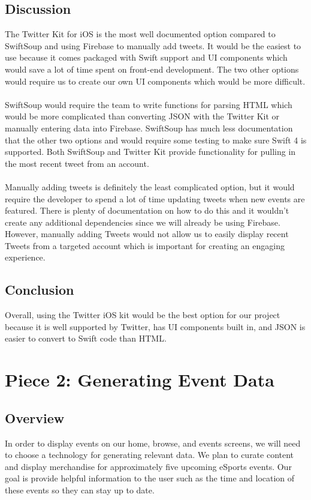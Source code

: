 \documentclass[onecolumn, draftclsnofoot,10pt, compsoc]{IEEEtran}
\begin{document}
\subsection{Discussion}
The Twitter Kit for iOS is the most well documented option compared to SwiftSoup and using Firebase to manually add tweets.
It would be the easiest to use because it comes packaged with Swift support and UI components which would save a lot of time spent on front-end development. 
The two other options would require us to create our own UI components which would be more difficult. \\ \\
\indent SwiftSoup would require the team to write functions for parsing HTML which would be more complicated than converting JSON with the Twitter Kit or manually entering data into Firebase. 
SwiftSoup has much less documentation that the other two options and would require some testing to make sure Swift 4 is supported. 
Both SwiftSoup and Twitter Kit provide functionality for pulling in the most recent tweet from an account. \\ \\
\indent Manually adding tweets is definitely the least complicated option, but it would require the developer to spend a lot of time updating tweets when new events are featured.
There is plenty of documentation on how to do this and it wouldn't create any additional dependencies since we will already be using Firebase. 
However, manually adding Tweets would not allow us to easily display recent Tweets from a targeted account which is important for creating an engaging experience.
\subsection{Conclusion}
Overall, using the Twitter iOS kit would be the best option for our project because it is well supported by Twitter, has UI components built in, and JSON is easier to convert to Swift code than HTML.

\section{Piece 2: Generating Event Data}
\subsection{Overview}
In order to display events on our home, browse, and events screens, we will need to choose a technology for generating relevant data. 
We plan to curate content and display merchandise for approximately five upcoming eSports events.
Our goal is provide helpful information to the user such as the time and location of these events so they can stay up to date. 
\end{document}
